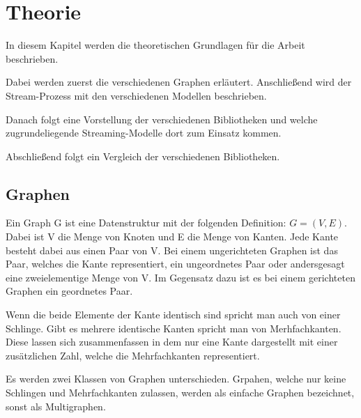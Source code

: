 \chapter{Theorie}
In diesem Kapitel werden die theoretischen Grundlagen für die Arbeit beschrieben.

Dabei werden zuerst die verschiedenen Graphen erläutert. Anschließend wird der
Stream-Prozess mit den verschiedenen Modellen beschrieben.

Danach folgt eine Vorstellung der verschiedenen Bibliotheken und welche
zugrundeliegende Streaming-Modelle dort zum Einsatz kommen.

Abschließend folgt ein Vergleich der verschiedenen Bibliotheken.

\section{Graphen}
Ein Graph G ist eine Datenstruktur mit der folgenden Definition: $G = (V,E)$.
Dabei ist V die Menge von Knoten und E die Menge von Kanten. Jede Kante besteht
dabei aus einen Paar von V. Bei einem ungerichteten Graphen ist das Paar, welches
die Kante representiert, ein ungeordnetes Paar oder andersgesagt eine
zweielementige Menge von V. Im Gegensatz dazu ist es bei einem gerichteten
Graphen ein geordnetes Paar.


Wenn die beide Elemente der Kante identisch sind spricht man auch von einer
Schlinge. Gibt es mehrere identische Kanten spricht man von Merhfachkanten.
Diese lassen sich zusammenfassen in dem nur eine Kante dargestellt mit einer
zusätzlichen Zahl, welche die Mehrfachkanten representiert.

Es werden zwei Klassen von Graphen unterschieden. Grpahen, welche nur keine
Schlingen und Mehrfachkanten zulassen, werden als einfache Graphen bezeichnet,
sonst als Multigraphen.


